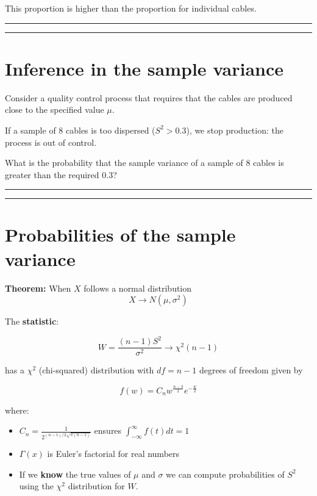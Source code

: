 \documentclass[
]{book}
\begin{document}
This proportion is higher than the proportion for individual cables.

\begin{center}\rule{0.5\linewidth}{0.5pt}\end{center}

\begin{center}\rule{0.5\linewidth}{0.5pt}\end{center}

\hypertarget{inference-in-the-sample-variance}{%
\section{Inference in the sample variance}\label{inference-in-the-sample-variance}}

Consider a quality control process that requires that the cables are produced close to the specified value \(\mu\).

If a sample of \(8\) cables is too dispersed (\(S^2>0.3\)), we stop production: the process is out of control.

What is the probability that the sample variance of a sample of \(8\) cables is greater than the required \(0.3\)?

\begin{center}\rule{0.5\linewidth}{0.5pt}\end{center}

\begin{center}\rule{0.5\linewidth}{0.5pt}\end{center}

\hypertarget{probabilities-of-the-sample-variance}{%
\section{Probabilities of the sample variance}\label{probabilities-of-the-sample-variance}}

\textbf{Theorem:} When \(X\) follows a normal distribution
\[X \rightarrow N(\mu, \sigma^2)\]

The \textbf{statistic}:

\[W=\frac{(n-1)S^2}{\sigma^2} \rightarrow \chi^2(n-1)\]

has a \(\chi^2\) (chi-squared) distribution with \(df=n-1\) degrees of freedom given by

\[f(w)=C_n  w^{\frac{n-3}{2}} e^{-\frac{w}{2}}\]

where:

\begin{itemize}
\item
  \(C_n=\frac{1}{2^{(n-1)/2\sqrt{\pi(n-1)}}}\) ensures \(\int_{-\infty}^{\infty} f(t)dt=1\)
\item
  \(\Gamma(x)\) is Euler's factorial for real numbers
\item
  If we \textbf{know} the true values of \(\mu\) and \(\sigma\) we can compute probabilities of \(S^2\) using the \(\chi^2\) distribution for \(W\).
\end{itemize}
\end{document}
